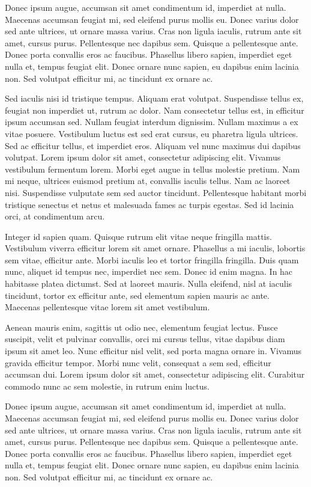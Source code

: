 \documentclass[12pt,a4paper,article]{memoir} %
\begin{document}
Donec ipsum augue, accumsan sit amet condimentum id, imperdiet at nulla. Maecenas accumsan feugiat mi, sed eleifend purus mollis eu. Donec varius dolor sed ante ultrices, ut ornare massa varius. Cras non ligula iaculis, rutrum ante sit amet, cursus purus. Pellentesque nec dapibus sem. Quisque a pellentesque ante. Donec porta convallis eros ac faucibus. Phasellus libero sapien, imperdiet eget nulla et, tempus feugiat elit. Donec ornare nunc sapien, eu dapibus enim lacinia non. Sed volutpat efficitur mi, ac tincidunt ex ornare ac.

Sed iaculis nisi id tristique tempus. Aliquam erat volutpat. Suspendisse tellus ex, feugiat non imperdiet ut, rutrum ac dolor. Nam consectetur tellus est, in efficitur ipsum accumsan sed. Nullam feugiat interdum dignissim. Nullam maximus a ex vitae posuere. Vestibulum luctus est sed erat cursus, eu pharetra ligula ultrices. Sed ac efficitur tellus, et imperdiet eros. Aliquam vel nunc maximus dui dapibus volutpat.
\newpage
Lorem ipsum dolor sit amet, consectetur adipiscing elit. Vivamus vestibulum fermentum lorem. Morbi eget augue in tellus molestie pretium. Nam mi neque, ultrices euismod pretium at, convallis iaculis tellus. Nam ac laoreet nisi. Suspendisse vulputate sem sed auctor tincidunt. Pellentesque habitant morbi tristique senectus et netus et malesuada fames ac turpis egestas. Sed id lacinia orci, at condimentum arcu.

Integer id sapien quam. Quisque rutrum elit vitae neque fringilla mattis. Vestibulum viverra efficitur lorem sit amet ornare. Phasellus a mi iaculis, lobortis sem vitae, efficitur ante. Morbi iaculis leo et tortor fringilla fringilla. Duis quam nunc, aliquet id tempus nec, imperdiet nec sem. Donec id enim magna. In hac habitasse platea dictumst. Sed at laoreet mauris. Nulla eleifend, nisl at iaculis tincidunt, tortor ex efficitur ante, sed elementum sapien mauris ac ante. Maecenas pellentesque vitae lorem sit amet vestibulum.

Aenean mauris enim, sagittis ut odio nec, elementum feugiat lectus. Fusce suscipit, velit et pulvinar convallis, orci mi cursus tellus, vitae dapibus diam ipsum sit amet leo. Nunc efficitur nisl velit, sed porta magna ornare in. Vivamus gravida efficitur tempor. Morbi nunc velit, consequat a sem sed, efficitur accumsan dui. Lorem ipsum dolor sit amet, consectetur adipiscing elit. Curabitur commodo nunc ac sem molestie, in rutrum enim luctus.

Donec ipsum augue, accumsan sit amet condimentum id, imperdiet at nulla. Maecenas accumsan feugiat mi, sed eleifend purus mollis eu. Donec varius dolor sed ante ultrices, ut ornare massa varius. Cras non ligula iaculis, rutrum ante sit amet, cursus purus. Pellentesque nec dapibus sem. Quisque a pellentesque ante. Donec porta convallis eros ac faucibus. Phasellus libero sapien, imperdiet eget nulla et, tempus feugiat elit. Donec ornare nunc sapien, eu dapibus enim lacinia non. Sed volutpat efficitur mi, ac tincidunt ex ornare ac.
\end{document}
